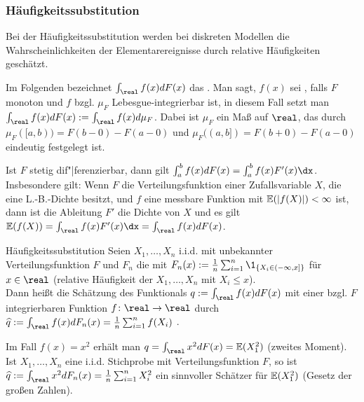 \subsubsection{%
    Häufigkeitssubstitution%
}

\begin{Bem}
    Bei der Häufigkeitssubstitution werden bei diskreten Modellen die Wahrscheinlichkeiten
    der Elementarereignisse durch relative Häufigkeiten geschätzt.

    Im Folgenden bezeichnet $\int_\real f(x) dF(x)$ das
    .
    Man sagt, $f(x)$ sei , falls $F$ monoton und
    $f$ bzgl. $\mu_F$ Lebesgue-integrierbar ist, in diesem Fall setzt man
    $\int_\real f(x) dF(x) := \int_\real f(x) d\mu_F$.
    Dabei ist $\mu_F$ ein Maß auf $\real$, das durch
    $\mu_F([a, b)) = F(b-0) - F(a-0)$ und
    $\mu_F((a, b]) = F(b+0) - F(a-0)$ eindeutig festgelegt ist.

    Ist $F$ stetig dif"|ferenzierbar, dann gilt $\int_a^b f(x) dF(x) = \int_a^b f(x)F'(x) \dx$.
    Insbesondere gilt:
    Wenn $F$ die Verteilungsfunktion einer Zufallsvariable $X$, die eine L.-B.-Dichte besitzt,
    und $f$ eine messbare Funktion mit $\mathbb{E}(|f(X)|) < \infty$ ist,
    dann ist die Ableitung $F'$ die Dichte von $X$ und es gilt
    $\EE(f(X)) = \int_\real f(x)F'(x) \dx = \int_\real f(x) dF(x)$.
\end{Bem}

\linie

\begin{Def}{Häufigkeitssubstitution}
    Seien $X_1, \dotsc, X_n$ i.i.d. mit unbekannter Verteilungsfunktion $F$
    und $F_n$ die  mit
    $F_n(x) := \frac{1}{n} \sum_{i=1}^n \1_{\{X_i \in (-\infty, x]\}}$ für $x \in \real$
    (relative Häufigkeit der $X_1, \dotsc, X_n$ mit $X_i \le x$).\\
    Dann heißt die Schätzung des Funktionals $q := \int_\real f(x) dF(x)$
    mit einer bzgl. $F$ integrierbaren Funktion $f\colon \real \rightarrow \real$ durch
    $\widehat{q} := \int_\real f(x) dF_n(x) = \frac{1}{n} \sum_{i=1}^n f(X_i)$
    .
\end{Def}

\linie

\begin{Bsp}
    Im Fall $f(x) = x^2$ erhält man $q = \int_\real x^2 dF(x) = \EE(X_1^2)$ (zweites Moment).
    Ist $X_1, \dotsc, X_n$ eine i.i.d. Stichprobe mit Verteilungsfunktion $F$, so ist\\
    $\widehat{q} := \int_\real x^2 dF_n(x) = \frac{1}{n} \sum_{i=1}^n X_i^2$
    ein sinnvoller Schätzer für $\mathbb{E}(X_1^2)$ (Gesetz der großen Zahlen).
\end{Bsp}

